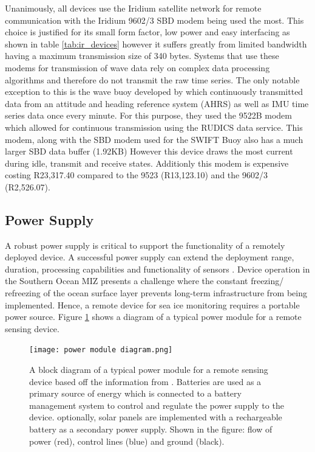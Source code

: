 Unanimously, all devices use the Iridium satellite network for remote communication with the Iridium 9602/3 SBD modem being used the most.  This choice is justified for its small form factor, low power and easy interfacing as shown in table \ref{tab:ir_devices} however it suffers greatly from limited bandwidth having a maximum transmission size of 340 bytes. Systems that use these modems for transmission of wave data rely on complex data processing algorithms and therefore do not transmit the raw time series. The only notable exception to this is the wave buoy developed by \textcite{doble2017robust} which continuously transmitted  data from an attitude and heading reference system (AHRS) as well as IMU time series data once every minute. For this purpose, they used the 9522B modem which allowed for continuous transmission using the RUDICS data service. This modem, along with the SBD modem used for the SWIFT Buoy also has a much larger SBD data buffer (1.92KB) However this device draws the most current during idle, transmit and receive states. Additionly this modem is expensive costing R23,317.40 compared to the 9523 (R13,123.10) and the 9602/3 (R2,526.07).  

\subsection{Power Supply}

A robust power supply is critical to support the functionality of a remotely deployed device. A successful power supply can extend the deployment range, duration, processing capabilities and functionality of sensors \cite{kennicutt2016delivering}. Device operation in the Southern Ocean MIZ presents a challenge where the constant freezing/ refreezing of the ocean surface layer prevents long-term infrastructure from being implemented. Hence, a remote device for sea ice monitoring requires a portable power source. Figure \ref{fig:powermoddiag} shows a diagram of a typical power module for a remote sensing device.

\begin{figure}[H]
	\centering
	\texttt{[image: power module diagram.png]}
	\caption{A block diagram of a typical power module for a remote sensing device based off the information from \cite{rabault2019open,doble2017robust,vidal2019xev}. Batteries are used as a primary source of energy which is connected to a battery management system to control and regulate the power supply to the device. optionally, solar panels are implemented with a rechargeable battery as a secondary power supply. Shown in the figure: flow of power (red), control lines (blue) and ground (black).}
	\label{fig:powermoddiag}
\end{figure}

